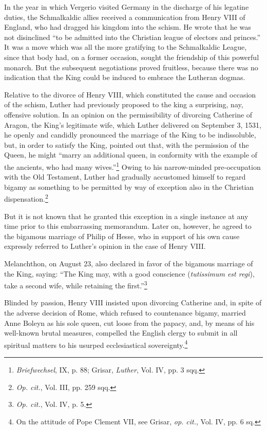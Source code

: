 In the year in which Vergerio visited Germany in the discharge
of his legatine duties, the Schmalkaldic allies received a communication
from Henry VIII of England, who had dragged his kingdom
into the schism. He wrote that he was not disinclined “to be admitted
into the Christian league of electors and princes.” It was a move
which was all the more gratifying to the Schmalkaldic League, since
that body had, on a former occasion, sought the friendship of this
powerful monarch. But the subsequent negotiations proved fruitless,
because there was no indication that the King could be induced to
embrace the Lutheran dogmas.

Relative to the divorce of Henry VIII, which constituted the cause and
occasion of the schism, Luther had previously proposed to the king a
surprising, nay, offensive solution. In an opinion on the permissibility of
divorcing Catherine of Aragon, the King’s legitimate wife, which Luther
delivered on September 3, 1531, he openly and candidly pronounced the marriage
of the King to be indissoluble, but, in order to satisfy the King, pointed
out that, with the permission of the Queen, he might “marry an additional
queen, in conformity with the example of the ancients, who had many
wives.”\footnote
{\textit{Briefwechsel}, IX, p. 88; Grisar, \textit{Luther}, Vol. IV, pp. 3 sqq.}
 Owing to his narrow-minded pre-occupation with the Old Testament,
Luther had gradually accustomed himself to regard bigamy as something
to be permitted by way of exception also in the Christian dispensation.\footnote
{\textit{Op. cit.}, Vol. III, pp. 259 sqq.}

But it is not known that he granted this exception in a single
instance at any time prior to this embarrassing memorandum. Later on, however,
he agreed to the bigamous marriage of Philip of Hesse, who in support
of his own cause expressly referred to Luther’s opinion in the case of
Henry VIII.

Melanchthon, on August 23, also declared in favor of the bigamous marriage
of the King, saying: “The King may, with a good conscience (\textit{tutissimum
est regi}), take a second wife, while retaining the first.”\footnote{\textit{Op. cit.}, Vol. IV, p. 5.}

Blinded by passion, Henry VIII insisted upon divorcing Catherine
and, in spite of the adverse decision of Rome, which refused to countenance
bigamy, married Anne Boleyn as his sole queen, cut
loose from the papacy, and, by means of his well-known brutal
measures, compelled the English clergy to submit in all spiritual
matters to his usurped ecclesiastical sovereignty.\footnote{On the attitude of Pope Clement VII, see Grisar, \textit{op. cit.}, Vol. IV, pp. 6 sq.}


